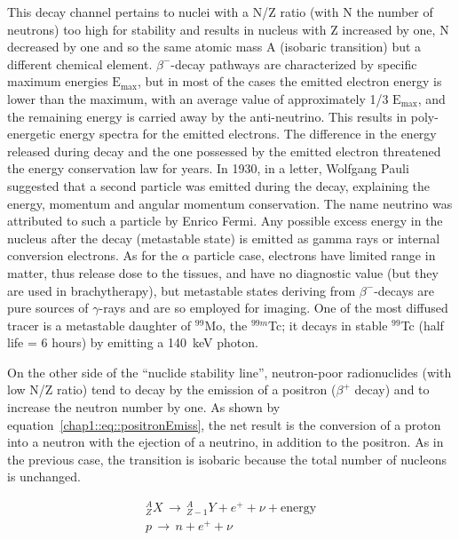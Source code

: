 This decay channel pertains to nuclei with a N/Z ratio (with N the number of neutrons) too high for stability and results in nucleus with Z increased by one, N decreased by one and so the same atomic mass A (isobaric transition) but a different chemical element. $\beta^-$-decay pathways are characterized by specific maximum energies $\mathrm{E_{max}}$, but in most of the cases the emitted electron energy is lower than the maximum, with an average value of approximately 1/3 $\mathrm{E_{max}}$, and the remaining energy is carried away by the anti-neutrino. This results in poly-energetic energy spectra for the emitted electrons. The difference in the energy released during decay and the one possessed by the emitted electron threatened the energy conservation law for years. In 1930, in a letter, Wolfgang Pauli suggested that a second particle was emitted during the decay, explaining the energy, momentum and angular momentum conservation. The name neutrino was attributed to such a particle by Enrico Fermi. 
Any possible excess energy in the nucleus after the decay (metastable state) is emitted as gamma rays or internal conversion electrons. As for the $\alpha$ particle case, electrons have limited range in matter, thus release dose to the tissues, and have no diagnostic value (but they are used in brachytherapy), but metastable states deriving from $\beta^-$-decays are pure sources of $\gamma$-rays and are so employed for imaging. One of the most diffused tracer is a metastable daughter of $^{99}$Mo, the $^{99m}$Tc; it decays in stable $^{99}$Tc (half life = 6 hours) by emitting a 140~keV photon.   

On the other side of the \enquote{nuclide stability line},  neutron-poor radionuclides (with low N/Z ratio) tend to decay by the emission of a positron ($\beta^+$ decay) and to increase the neutron number by one. As shown by equation~\ref{chap1::eq::positronEmiss}, the net result is the conversion of a proton into a neutron with the ejection of a neutrino, in addition to the positron. As in the previous case, the transition is isobaric because the total number of nucleons is unchanged.

 \begin{equation}\label{chap1::eq::positronEmiss}
\begin{split}
^{A}_{Z}X \, \rightarrow \, ^{A}_{Z-1}Y + e^{+} + \nu + \mathrm{energy} \\
p \, \rightarrow \, n + e^{+} + \nu 
\end{split}
\end{equation}     

